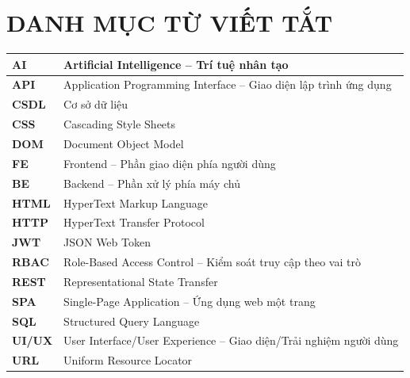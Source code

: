 \chapter*{DANH MỤC TỪ VIẾT TẮT}

\begin{longtable}{|>{\bfseries}p{}|p{}|}
\hline
AI & Artificial Intelligence -- Trí tuệ nhân tạo \\
\hline
API & Application Programming Interface -- Giao diện lập trình ứng dụng \\
\hline
CSDL & Cơ sở dữ liệu \\
\hline
CSS & Cascading Style Sheets \\
\hline
DOM & Document Object Model \\
\hline
FE & Frontend -- Phần giao diện phía người dùng \\
\hline
BE & Backend -- Phần xử lý phía máy chủ \\
\hline
HTML & HyperText Markup Language \\
\hline
HTTP & HyperText Transfer Protocol \\
\hline
JWT & JSON Web Token \\
\hline
RBAC & Role-Based Access Control -- Kiểm soát truy cập theo vai trò \\
\hline
REST & Representational State Transfer \\
\hline
SPA & Single-Page Application -- Ứng dụng web một trang \\
\hline
SQL & Structured Query Language \\
\hline
UI/UX & User Interface/User Experience -- Giao diện/Trải nghiệm người dùng \\
\hline
URL & Uniform Resource Locator \\
\hline
\end{longtable}
